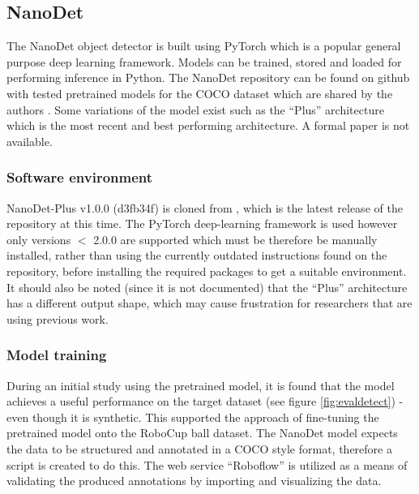 \documentclass[a4paper,twoside,12pt]{report}
\begin{document}
\subsection{NanoDet}

The NanoDet object detector is built using PyTorch which is a popular general purpose deep learning framework. Models can be trained, stored and loaded for performing inference in Python. The NanoDet repository can be found on github with tested pretrained models for the COCO dataset which are shared by the authors \citep{nanodet}. Some variations of the model exist such as the ``Plus'' architecture which is the most recent and best performing architecture. A formal paper is not available.


\subsubsection{Software environment}

NanoDet-Plus v1.0.0 (d3fb34f) is cloned from \cite{nanodet}, which is the latest release of the repository at this time. The PyTorch deep-learning framework is used however only versions $<$ 2.0.0 are supported which must be therefore be manually installed, rather than using the currently outdated instructions found on the repository, before installing the required packages to get a suitable environment. It should also be noted (since it is not documented) that the ``Plus'' architecture has a different output shape, which may cause frustration for researchers that are using previous work.

\subsubsection{Model training}

During an initial study using the pretrained model, it is found that the model achieves a useful performance on the target dataset (see figure \ref{fig:evaldetect}) - even though it is synthetic. This supported the approach of fine-tuning the pretrained model onto the RoboCup ball dataset. The NanoDet model expects the data to be structured and annotated in a COCO style format, therefore a script is created to do this. The web service ``Roboflow'' \citep{roboflow} is utilized as a means of validating the produced annotations by importing and visualizing the data. 
\end{document}
